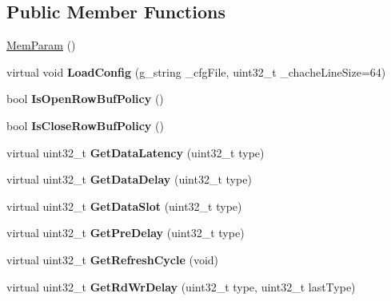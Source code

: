\subsection*{Public Member Functions}
\begin{DoxyCompactItemize}
\item 
\hyperlink{classMemParam_a85006f1c80158d176a10a867cc8393e8}{Mem\-Param} ()
\item 
\hypertarget{classMemParam_a881d234c7cbfd73c252abedd51d2a6ff}{virtual void {\bfseries Load\-Config} (g\-\_\-string \-\_\-cfg\-File, uint32\-\_\-t \-\_\-chache\-Line\-Size=64)}\label{classMemParam_a881d234c7cbfd73c252abedd51d2a6ff}

\item 
\hypertarget{classMemParam_a82748bb38598ad9aaebb7aa1e981a718}{bool {\bfseries Is\-Open\-Row\-Buf\-Policy} ()}\label{classMemParam_a82748bb38598ad9aaebb7aa1e981a718}

\item 
\hypertarget{classMemParam_a2809795fb8a5862894b77528df8d74a6}{bool {\bfseries Is\-Close\-Row\-Buf\-Policy} ()}\label{classMemParam_a2809795fb8a5862894b77528df8d74a6}

\item 
\hypertarget{classMemParam_a2a71a44e4e853453a0e00384674523ef}{virtual uint32\-\_\-t {\bfseries Get\-Data\-Latency} (uint32\-\_\-t type)}\label{classMemParam_a2a71a44e4e853453a0e00384674523ef}

\item 
\hypertarget{classMemParam_a0852c64cadacd3690e22023aab757231}{virtual uint32\-\_\-t {\bfseries Get\-Data\-Delay} (uint32\-\_\-t type)}\label{classMemParam_a0852c64cadacd3690e22023aab757231}

\item 
\hypertarget{classMemParam_ad179313faebb4718eff9a063828892cd}{virtual uint32\-\_\-t {\bfseries Get\-Data\-Slot} (uint32\-\_\-t type)}\label{classMemParam_ad179313faebb4718eff9a063828892cd}

\item 
\hypertarget{classMemParam_a6fccdb2e6533b4e2a68a016fa6007591}{virtual uint32\-\_\-t {\bfseries Get\-Pre\-Delay} (uint32\-\_\-t type)}\label{classMemParam_a6fccdb2e6533b4e2a68a016fa6007591}

\item 
\hypertarget{classMemParam_ac09217459346079151a2bf0756844710}{virtual uint32\-\_\-t {\bfseries Get\-Refresh\-Cycle} (void)}\label{classMemParam_ac09217459346079151a2bf0756844710}

\item 
\hypertarget{classMemParam_a095f8a3f720e996f47fe45afc930b3e2}{virtual uint32\-\_\-t {\bfseries Get\-Rd\-Wr\-Delay} (uint32\-\_\-t type, uint32\-\_\-t last\-Type)}\label{classMemParam_a095f8a3f720e996f47fe45afc930b3e2}


\end{DoxyCompactItemize}

